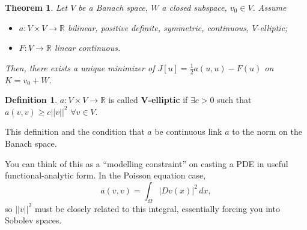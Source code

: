\documentclass[12pt]{article}
\newtheorem{theorem}{Theorem}[section]
\theoremstyle{definition}
\newtheorem*{definition*}{Definition}
\begin{document}
\begin{theorem}\label{existence_minimizer}
Let $V$ be a Banach space, $W$ a closed subspace, $v_0\in V$. Assume
\begin{itemize}
\item $a:V\times V\rightarrow\mathbb R$ bilinear, positive definite, symmetric, continuous, $V$-elliptic;
\item $F:V\rightarrow\mathbb R$ linear continuous.
\end{itemize}
Then, there exists a unique minimizer of $J[u]=\frac12a(u,u)-F(u)$ on $K=v_0+W$.
\end{theorem}

\begin{definition*}
$a:V\times V\rightarrow\mathbb R$ is called \textbf{$\boldsymbol V$-elliptic} if $\exists c>0$ such that $a(v,v)\geq c||v||^2$ $\forall v\in V$.
\end{definition*}

This definition and the condition that $a$ be continuous link $a$ to the norm on the Banach space.

You can think of this as a ``modelling constraint'' on casting a PDE in useful functional-analytic form. In the Poisson equation case,
\[a(v,v)=\int_\Omega|Dv(x)|^2\,dx,\]
so $||v||^2$ must be closely related to this integral, essentially forcing you into Sobolev spaces.
\end{document}
